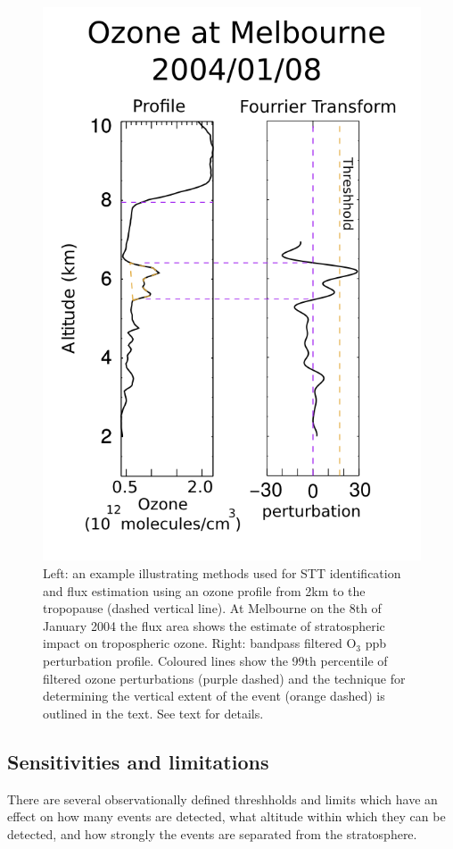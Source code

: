 \documentclass{article}
\begin{document}
    \begin{figure}[!htbp]
      \begin{center}
      \includegraphics[width=0.8\columnwidth]{figures/filtereg.png}
      \caption{ Left: an example illustrating methods used for STT identification and flux estimation using an ozone profile from 2km to the tropopause (dashed vertical line).
      At Melbourne on the 8th of January 2004 the flux area shows the estimate of stratospheric impact on tropospheric ozone.
      Right: bandpass filtered O$_3$ ppb perturbation profile.
      Coloured lines show the 99th percentile of filtered ozone perturbations (purple dashed) and the technique for determining the vertical extent of the event (orange dashed) is outlined in the text.
      See text for details.
      }
      \label{fig:filterEG}
      \end{center}
    \end{figure}

  \subsection{Sensitivities and limitations}
    There are several observationally defined threshholds and limits which have an effect on how many events are detected, what altitude within which they can be detected, and how strongly the events are separated from the stratosphere.
    
\end{document}
